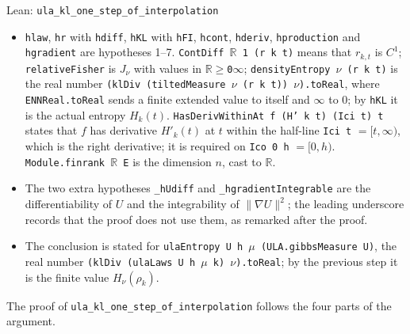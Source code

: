 \documentclass[11pt,a4paper]{article}
\begin{document}
\begin{leanbox}{Lean: \texttt{ula\_\allowbreak{}kl\_\allowbreak{}one\_\allowbreak{}step\_\allowbreak{}of\_\allowbreak{}interpolation}}
\begin{itemize}
\item \texttt{hlaw}, \texttt{hr} with \texttt{hdiff}, \texttt{h\allowbreak{}KL} with \texttt{h\allowbreak{}FI}, \texttt{hcont}, \texttt{hderiv}, \texttt{hproduction} and \texttt{hgradient} are hypotheses 1–7. \texttt{Cont\allowbreak{}Diff \ensuremath{\mathbb R} 1 (r k t)} means that \(r_{k,t}\) is \(C^1\); \texttt{relative\allowbreak{}Fisher} is \(J_\nu\) with values in \texttt{\ensuremath{\mathbb R}\ensuremath{\ge}0\ensuremath{\infty}}; \texttt{density\allowbreak{}Entropy \ensuremath{\nu} (r k t)} is the real number \texttt{(kl\allowbreak{}Div (tilted\allowbreak{}Measure \ensuremath{\nu} (r k t)) \ensuremath{\nu}).\allowbreak{}to\allowbreak{}Real}, where \texttt{ENNReal.\allowbreak{}to\allowbreak{}Real} sends a finite extended value to itself and \(\infty\) to \(0\); by \texttt{h\allowbreak{}KL} it is the actual entropy \(H_k(t)\). \texttt{Has\allowbreak{}Deriv\allowbreak{}Within\allowbreak{}At f (H' k t) (Ici t) t} states that \(f\) has derivative \(H'_k(t)\) at \(t\) within the half-line \texttt{Ici t} \(=[t,\infty)\), which is the right derivative; it is required on \texttt{Ico 0 h} \(=[0,h)\). \texttt{Module.\allowbreak{}finrank \ensuremath{\mathbb R} E} is the dimension \(n\), cast to \(\mathbb R\).

\item The two extra hypotheses \texttt{\_\allowbreak{}h\allowbreak{}Udiff} and \texttt{\_\allowbreak{}hgradient\allowbreak{}Integrable} are the differentiability of \(U\) and the integrability of \(\|\nabla U\|^2\); the leading underscore records that the proof does not use them, as remarked after the proof.

\item The conclusion is stated for \texttt{ula\allowbreak{}Entropy U h \ensuremath{\mu} (ULA.\allowbreak{}gibbs\allowbreak{}Measure U)}, the real number \texttt{(kl\allowbreak{}Div (ula\allowbreak{}Laws U h \ensuremath{\mu} k) \ensuremath{\nu}).\allowbreak{}to\allowbreak{}Real}; by the previous step it is the finite value \(H_\nu(\rho_k)\).

\end{itemize}



The proof of \texttt{ula\_\allowbreak{}kl\_\allowbreak{}one\_\allowbreak{}step\_\allowbreak{}of\_\allowbreak{}interpolation} follows the four parts of the argument.



\begin{enumerate}



\end{enumerate}
\end{leanbox}
\end{document}
